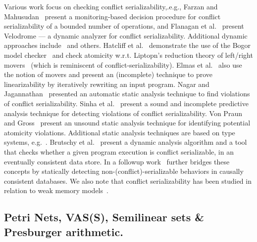 Various work focus on checking conflict serializability,.e.g., Farzan and 
Mahusudan~\cite{FaMa08} present a monitoring-based decision procedure for 
conflict serializability of a bounded number of operations, and Flanagan et 
al.~\cite{FlFrYi08} present Velodrome --- a dynamic analyzer for conflict 
serializability. Additional dynamic approaches include~\cite{FlFr04, XuBoRa05, 
WaSt06a, CoOlPnTuZu07, EmMaMa10, SiMaWaGu11a} and others.
%
%
Hatcliff et al.~\cite{HaRoDw04} demonstrate the use of the Bogor model 
checker~\cite{RoDwHa03} and check atomicity w.r.t. Liptopn's reduction theory 
of left/right movers~\cite{Li75} (which is reminiscent of 
conflict-serializability).
%
Elmas et al.~\cite{ElQaSeSuTa10} also use the notion of movers and present an 
(incomplete) technique to prove linearizability by iteratively rewriting an 
input program.
%
Nagar and Jagannathan~\cite{KaJa18} presented an 
automatic static analysis technique to find violations of conflict 
serializability.
%
Sinha et al.~\cite{SiMaWaGu11b} present a sound and incomplete predictive 
analysis technique for detecting violations of conflict serializability.
%
Von Praun and Gross~\cite{VoGr04} present an unsound static analysis technique 
for identifying potential atomicity violations. Additional static analysis 
techniques are based on type systems, e.g.~\cite{FlQa03, FlFrLiQa08}.
%
Brutschy et al.~\cite{BrDiMuVe17} present a dynamic analysis algorithm and a 
tool that checks whether a given program execution is conflict serializable, in 
an eventually consistent data store. In a followup work~\cite{BrDiMuVe18} 
further bridges these concepts by statically detecting 
non-(conflict)-serializable behaviors in causally consistent databases.
%
%
%
We also note that conflict serializability has been studied in relation to weak 
memory models~\cite{EnFa16}.
%





\subsection{Petri Nets, VAS(S), Semilinear sets  \& Presburger arithmetic.}
\label{sec:related:petri}

